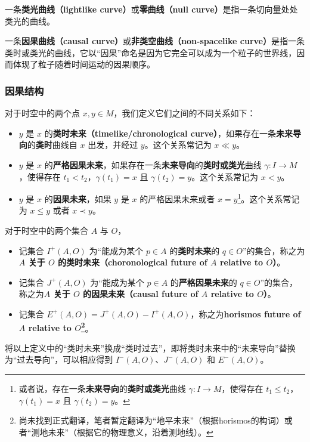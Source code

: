 一条\textbf{类光曲线（lightlike curve）}或\textbf{零曲线（null curve）}是指一条切向量处处类光的曲线。

一条\textbf{因果曲线（causal curve）}或\textbf{非类空曲线（non-spacelike curve）}是指一条类时或类光的曲线，它以“因果”命名是因为它完全可以成为一个粒子的世界线，因而体现了粒子随着时间运动的因果顺序。


\subsubsection{因果结构}

对于时空中的两个点 $x, y\in M$，我们定义它们之间的不同关系如下：

\begin{itemize}
\item $y$ 是 $x$ 的\textbf{类时未来（timelike/chronological curve）}，如果存在一条\textbf{未来导向}的\textbf{类时}曲线自 $x$ 出发，并经过 $y$。这个关系常记为 $x\ll y$。
\item $y$ 是 $x$ 的\textbf{严格因果未来}，如果存在一条\textbf{未来导向}的\textbf{类时或类光}曲线 $\gamma:I\rightarrow M$，使得存在 $t_1<t_2$，$\gamma(t_1)=x$ 且 $\gamma(t_2)=y$。这个关系常记为 $x< y$。
\item $y$ 是 $x$ 的\textbf{因果未来}，如果 $y$ 是 $x$ 的严格因果未来或者 $x=y$\footnote{或者说，存在一条\textbf{未来导向}的\textbf{类时或类光}曲线 $\gamma:I\rightarrow M$，使得存在 $t_1\leq t_2$，$\gamma(t_1)=x$ 且 $\gamma(t_2)=y$。}。这个关系常记为 $x\leq y$ 或者 $x\prec y$。
\end{itemize}

对于时空中的两个集合 $A$ 与 $O$，


\begin{itemize}
\item 记集合 $I^+(A, O)$ 为“能成为某个 $p\in A$ 的\textbf{类时未来}的 $q\in O$”的集合，称之为\textbf{$A$ 关于 $O$ 的类时未来（choronological future of $A$ relative to $O$）}。
\item 记集合 $J^+(A, O)$ 为“能成为某个 $p\in A$ 的\textbf{严格因果未来}的 $q\in O$”的集合，称之为\textbf{$A$ 关于 $O$ 的因果未来（causal future of $A$ relative to $O$）}。
\item 记集合 $E^+(A, O)=J^+(A, O)-I^+(A, O)$，称之为\textbf{horismos future of $A$ relative to $O$\footnote{尚未找到正式翻译，笔者暂定翻译为“地平未来”（根据horismos的构词）或者“测地未来”（根据它的物理意义，沿着测地线）。}}。
\end{itemize}

将以上定义中的“类时未来”换成“类时过去”，即将类时未来中的“未来导向”替换为“过去导向”，可以相应得到 $I^-(A, O)$、$J^-(A, O)$ 和 $E^-(A, O)$。

